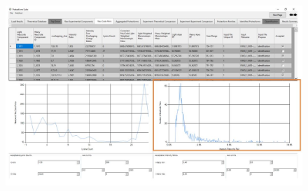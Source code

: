 \begin{itemize}
	\begin{figure}[h]
\centering
\includegraphics[scale=0.5]{figures/neucode4.jpg}
\end{figure}
\end{itemize}